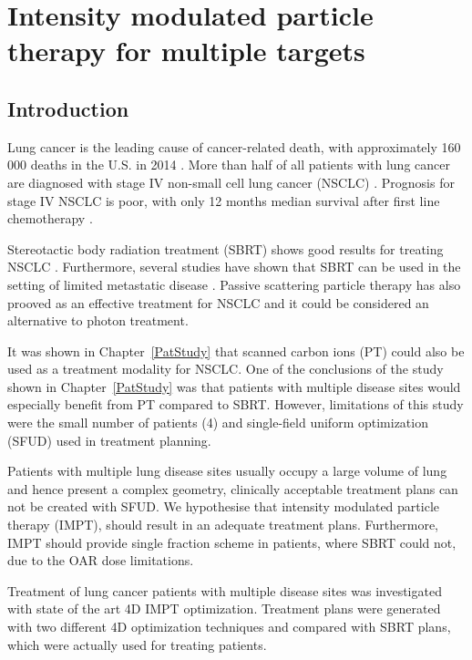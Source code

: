 \documentclass[type=dr, dr=rernat, accentcolor=tud7b,colorbacktitle, bigchapter, openright, twoside, 12pt ]{tudthesis}
\begin{document}
\chapter{Intensity modulated particle therapy for multiple targets}
\label{chapter:vmm}
\minitoc

\section{Introduction}

Lung cancer is the leading cause of cancer-related death, with approximately 160 000 deaths in the U.S. in 2014 \cite{Siegel2014}.
More than half of all patients with lung cancer are diagnosed with stage IV non-small cell lung cancer (NSCLC) \cite{Ramalingam2008, Iyengar2014}.
Prognosis for stage IV NSCLC is poor, with only 12 months median survival after first line chemotherapy \cite{Socinski2013}. 

Stereotactic body radiation treatment (SBRT) shows good results for treating NSCLC \cite{Baumann2009, Fakiris2009, Grutters2010, Greco2011}. 
Furthermore, several studies have shown that SBRT can be used in the setting of limited metastatic 
disease \cite{Rusthoven2009, Villaruz2012, Salama2012, Iyengar2014}. 
Passive scattering particle therapy has also prooved as an effective treatment for NSCLC \cite{Grutters2010, Tsujii2012} and it could be considered an alternative
to photon treatment.

It was shown in Chapter~\ref{PatStudy} that scanned carbon ions (PT) could also be used as a treatment modality for NSCLC. One of the conclusions of the study shown in Chapter~\ref{PatStudy} 
was that patients with multiple disease sites would especially benefit from PT compared to SBRT. However, limitations of this study were the small number of patients (4) and single-field uniform optimization (SFUD) used in treatment planning. 

Patients with multiple lung disease sites usually occupy a large volume of lung and hence present a complex geometry, clinically acceptable treatment plans can not be created with SFUD. 
We hypothesise that intensity modulated particle therapy (IMPT), should result in an adequate treatment plans. Furthermore, IMPT should provide single fraction scheme in patients, where SBRT could not, due to the OAR dose limitations. 

Treatment of lung cancer patients  with multiple disease sites was investigated with state of the art 4D IMPT optimization. 
Treatment plans were generated with two different 4D optimization techniques and compared with SBRT plans, which were actually used for treating patients.
\end{document}
